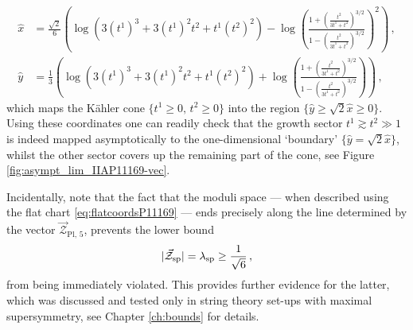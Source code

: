 %
\begin{equation}\label{eq:flatcoordsP11169}
 \begin{aligned}
     \hat{x} &= \frac{\sqrt{2}}{6} \left( \log \left( 3(t^1)^3 + 3(t^1)^2t^2 + t^1(t^2)^2 \right) - \log \left( \frac{1+\left( \frac{t^2}{3t^1 + t^2} \right)^{3/2}}{1-\left( \frac{t^2}{3t^1 + t^2} \right)^{3/2}} \right)^2\right)\, ,\\
     \hat{y} &= \frac{1}{3} \left( \log \left( 3(t^1)^3 + 3(t^1)^2t^2 + t^1(t^2)^2 \right) + \log \left( \frac{1+\left( \frac{t^2}{3t^1 + t^2} \right)^{3/2}}{1-\left( \frac{t^2}{3t^1 + t^2} \right)^{3/2}} \right)\right)\, ,
 \end{aligned}
\end{equation}
%
which maps the K\"ahler cone $\{t^1\geq 0,\,t^2\geq 0\}$ into the region $\{\hat{y}\geq \sqrt{2}\hat{x}\geq 0\}$. Using these coordinates one can readily check that the growth sector $t^1\gtrsim t^2 \gg 1$ is indeed mapped asymptotically to the one-dimensional `boundary' $\{\hat{y}=\sqrt{2}\hat{x}\}$, whilst the other sector covers up the remaining part of the cone, see Figure \ref{fig:asympt_lim_IIAP11169-vec}.

Incidentally, note that the fact that the moduli space --- when described using the flat chart \eqref{eq:flatcoordsP11169} --- ends precisely along the line determined by the vector $\vec{\mathcal{Z}}_{\text{Pl},\, 5}$, prevents the lower bound
%
\begin{equation}\label{eq:SSDC4d}
	|\vec{\mathcal{Z}}_{\text{sp}}|=\lambda_{\rm sp} \geq \frac{1}{\sqrt{6}}\, ,
\end{equation}
%
from being immediately violated. This provides further evidence for the latter, which was discussed and tested only in string theory set-ups with maximal supersymmetry, see Chapter \ref{ch:bounds} for details.
	
	
	
